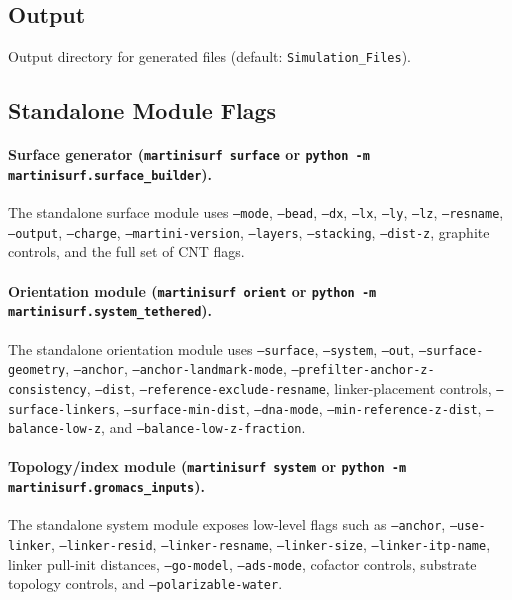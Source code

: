 \documentclass[11pt]{article}
\begin{document}
\subsection{Output}

\begin{description}[leftmargin=3cm,style=nextline]

\item[\texttt{--outdir}]
Output directory for generated files
(default: \texttt{Simulation\_Files}).

\end{description}

\subsection{Standalone Module Flags}

\paragraph{Surface generator (\texttt{martinisurf surface} or \texttt{python -m martinisurf.surface\_builder}).}
The standalone surface module uses \texttt{--mode}, \texttt{--bead},
\texttt{--dx}, \texttt{--lx}, \texttt{--ly}, \texttt{--lz},
\texttt{--resname}, \texttt{--output}, \texttt{--charge},
\texttt{--martini-version}, \texttt{--layers}, \texttt{--stacking}, \texttt{--dist-z},
graphite controls, and the full set of CNT flags.

\paragraph{Orientation module (\texttt{martinisurf orient} or \texttt{python -m martinisurf.system\_tethered}).}
The standalone orientation module uses \texttt{--surface},
\texttt{--system}, \texttt{--out}, \texttt{--surface-geometry},
\texttt{--anchor}, \texttt{--anchor-landmark-mode},
\texttt{--prefilter-anchor-z-consistency}, \texttt{--dist},
\texttt{--reference-exclude-resname}, linker-placement controls,
\texttt{--surface-linkers}, \texttt{--surface-min-dist},
\texttt{--dna-mode}, \texttt{--min-reference-z-dist},
\texttt{--balance-low-z}, and \texttt{--balance-low-z-fraction}.

\paragraph{Topology/index module (\texttt{martinisurf system} or \texttt{python -m martinisurf.gromacs\_inputs}).}
The standalone system module exposes low-level flags such as
\texttt{--anchor}, \texttt{--use-linker}, \texttt{--linker-resid},
\texttt{--linker-resname}, \texttt{--linker-size},
\texttt{--linker-itp-name}, linker pull-init distances,
\texttt{--go-model}, \texttt{--ads-mode}, cofactor controls,
substrate topology controls, and \texttt{--polarizable-water}.
\end{document}
